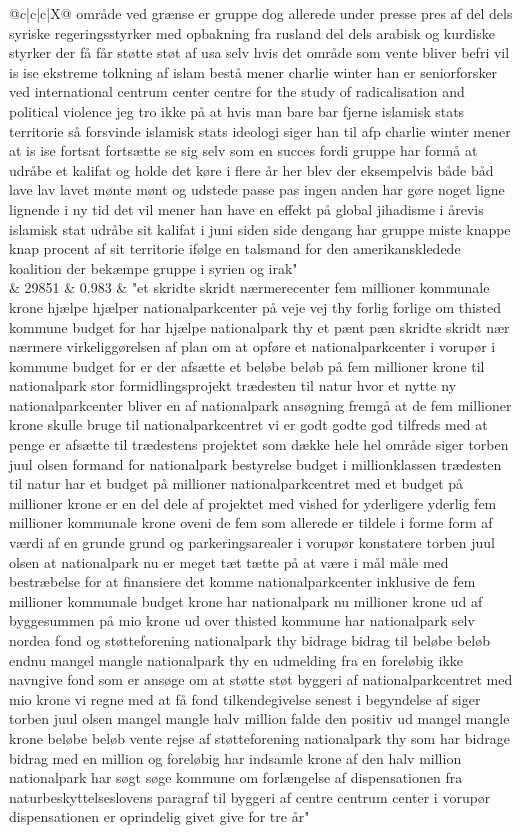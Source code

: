 \begin{xltabular}{\linewidth}{@{}c|c|c|X@{}}
område ved grænse er gruppe dog allerede under presse pres af del dels syriske regeringsstyrker med opbakning fra rusland del dels arabisk og kurdiske styrker der få får støtte støt af usa selv hvis det område som vente bliver befri vil is ise ekstreme tolkning af islam bestå mener charlie winter han er seniorforsker ved international centrum center centre for the study of radicalisation and political violence jeg tro ikke på at hvis man bare bar fjerne islamisk stats territorie så forsvinde islamisk stats ideologi siger han til afp charlie winter mener at is ise fortsat fortsætte se sig selv som en succes fordi gruppe har formå at udråbe et kalifat og holde det køre i flere år her blev der eksempelvis både båd lave lav lavet mønte mønt og udstede passe pas ingen anden har gøre noget ligne lignende i ny tid det vil mener han have en effekt på global jihadisme i årevis islamisk stat udråbe sit kalifat i juni siden side dengang har gruppe miste knappe knap procent af sit territorie ifølge en talsmand for den amerikanskledede koalition der bekæmpe gruppe i syrien og irak" \\
		 & 29851 & 0.983 & "et skridte skridt nærmerecenter fem millioner kommunale krone hjælpe hjælper nationalparkcenter på veje vej thy forlig forlige om thisted kommune budget for har hjælpe nationalpark thy et pænt pæn skridte skridt nær nærmere virkeliggørelsen af plan om at opføre et nationalparkcenter i vorupør i kommune budget for er der afsætte et beløbe beløb på fem millioner krone til nationalpark stor formidlingsprojekt trædesten til natur hvor et nytte ny nationalparkcenter bliver en af nationalpark ansøgning fremgå at de fem millioner krone skulle bruge til nationalparkcentret vi er godt godte god tilfreds med at penge er afsætte til trædestens projektet som dække hele hel område siger torben juul olsen formand for nationalpark bestyrelse budget i millionklassen trædesten til natur har et budget på millioner nationalparkcentret med et budget på millioner krone er en del dele af projektet med vished for yderligere yderlig fem millioner kommunale krone oveni de fem som allerede er tildele i forme form af værdi af en grunde grund og parkeringsarealer i vorupør konstatere torben juul olsen at nationalpark nu er meget tæt tætte på at være i mål måle med bestræbelse for at finansiere det komme nationalparkcenter inklusive de fem millioner kommunale budget krone har nationalpark nu millioner krone ud af byggesummen på mio krone ud over thisted kommune har nationalpark selv nordea fond og støtteforening nationalpark thy bidrage bidrag til beløbe beløb endnu mangel mangle nationalpark thy en udmelding fra en foreløbig ikke navngive fond som er ansøge om at støtte støt byggeri af nationalparkcentret med mio krone vi regne med at få fond tilkendegivelse senest i begyndelse af siger torben juul olsen mangel mangle halv million falde den positiv ud mangel mangle krone beløbe beløb vente rejse af støtteforening nationalpark thy som har bidrage bidrag med en million og foreløbig har indsamle krone af den halv million nationalpark har søgt søge kommune om forlængelse af dispensationen fra naturbeskyttelseslovens paragraf til byggeri af centre centrum center i vorupør dispensationen er oprindelig givet give for tre år" \\

\end{xltabular}

